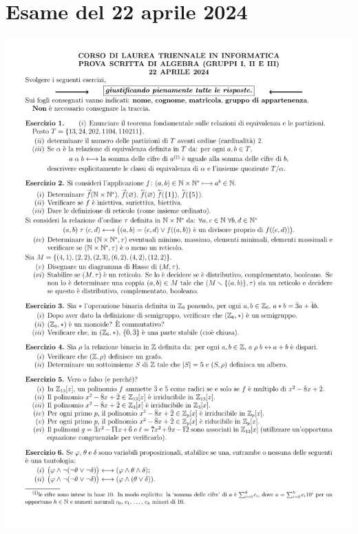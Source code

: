 \section{Esame del 22 aprile 2024}
\begin{center}
	\includegraphics[scale=.85]{pdf/24-04-22.pdf}
\end{center}
